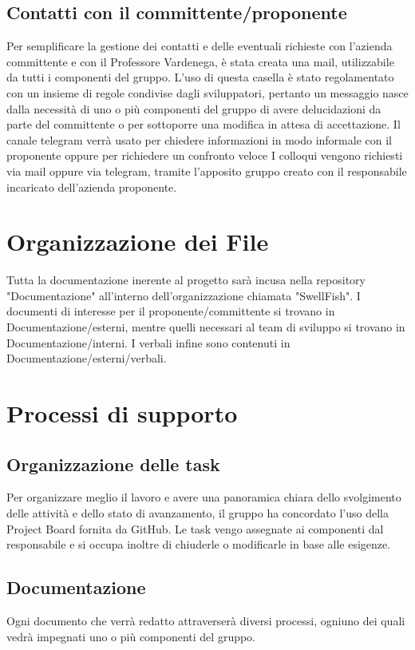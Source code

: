 \documentclass[12pt]{article}
\begin{document}
\subsection{Contatti con il committente/proponente}
Per semplificare la gestione dei contatti e delle eventuali richieste con l'azienda committente e con il Professore Vardenega, è stata creata una mail, \href{swellfish14@gmail.com}{} utilizzabile da tutti i componenti del gruppo.
L'uso di questa casella è stato regolamentato con un insieme di regole condivise dagli sviluppatori, pertanto un messaggio nasce dalla necessità di uno o più componenti del gruppo di avere delucidazioni da parte del committente o per sottoporre una modifica in attesa di accettazione.
Il canale telegram verrà usato per chiedere informazioni in modo informale con il proponente oppure per richiedere un confronto veloce 
I colloqui vengono richiesti via mail oppure via telegram, tramite l'apposito gruppo creato con il responsabile incaricato dell'azienda proponente.

\section{Organizzazione dei File}
Tutta la documentazione inerente al progetto sarà incusa nella repository "Documentazione" all'interno dell'organizzazione chiamata "SwellFish".
I documenti di interesse per il proponente/committente si trovano in Documentazione/esterni, mentre quelli necessari al team di sviluppo si trovano in Documentazione/interni. I verbali infine sono contenuti in Documentazione/esterni/verbali.



\section{Processi di supporto}
\subsection{Organizzazione delle task}
Per organizzare meglio il lavoro e avere una panoramica chiara dello svolgimento delle attività e dello stato di avanzamento, il gruppo ha concordato l'uso della Project Board fornita da GitHub.
Le task vengo assegnate ai componenti dal responsabile e si occupa inoltre di chiuderle o modificarle in base alle esigenze.

\subsection{Documentazione}
Ogni documento che verrà redatto attraverserà diversi processi, ogniuno dei quali vedrà impegnati uno o più componenti del gruppo.
\end{document}
